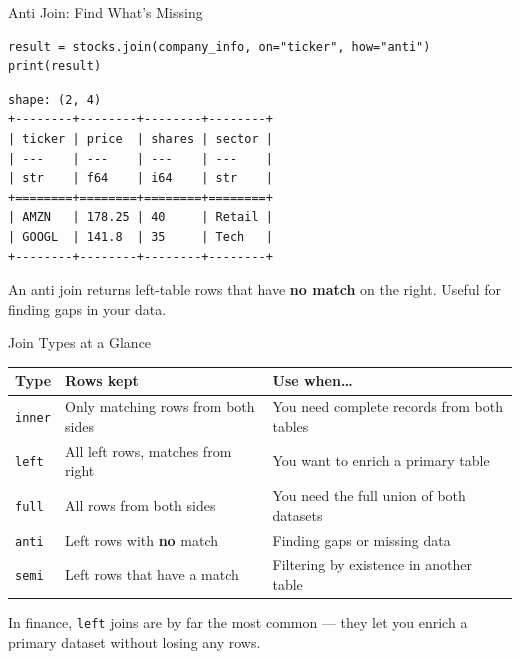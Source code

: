 \documentclass[9pt,aspectratio=169]{beamer}
\begin{document}
\begin{frame}[fragile]{Anti Join: Find What's Missing}

\begin{lstlisting}
result = stocks.join(company_info, on="ticker", how="anti")
print(result)
\end{lstlisting}

\begin{lstlisting}[style=output]
shape: (2, 4)
+--------+--------+--------+--------+
| ticker | price  | shares | sector |
| ---    | ---    | ---    | ---    |
| str    | f64    | i64    | str    |
+========+========+========+========+
| AMZN   | 178.25 | 40     | Retail |
| GOOGL  | 141.8  | 35     | Tech   |
+--------+--------+--------+--------+
\end{lstlisting}

\medskip

An \alert{anti join} returns left-table rows that have \textbf{no match} on the right. Useful for finding gaps in your data.

\end{frame}


\begin{frame}{Join Types at a Glance}

\begin{tabular}{@{}lp{5cm}p{4.5cm}@{}}
\toprule
\textbf{Type} & \textbf{Rows kept} & \textbf{Use when\ldots} \\
\midrule
\texttt{inner} & Only matching rows from both sides & You need complete records from both tables \\[0.4em]
\texttt{left} & All left rows, matches from right & You want to enrich a primary table \\[0.4em]
\texttt{full} & All rows from both sides & You need the full union of both datasets \\[0.4em]
\texttt{anti} & Left rows with \textbf{no} match & Finding gaps or missing data \\[0.4em]
\texttt{semi} & Left rows that have a match & Filtering by existence in another table \\
\bottomrule
\end{tabular}

\bigskip

\begin{highlightbox}
In finance, \texttt{left} joins are by far the most common --- they let you enrich a primary dataset without losing any rows.
\end{highlightbox}

\end{frame}
\end{document}
